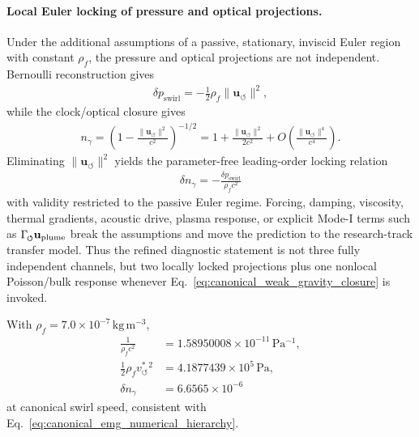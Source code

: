\documentclass[11pt]{article}
\theoremstyle{definition}
\theoremstyle{plain}
\theoremstyle{remark}
\newcommand{\swirlarrow}{\mathchoice{\mkern-2mu\scriptstyle\boldsymbol{\circlearrowleft}}{\mkern-2mu\scriptstyle\boldsymbol{\circlearrowleft}}{\mkern-2mu\scriptscriptstyle\boldsymbol{\circlearrowleft}}{\mkern-2mu\scriptscriptstyle\boldsymbol{\circlearrowleft}}}
\newcommand{\rhoF}{{\rho_{\!f}}}
\newcommand{\vchar}{v_{\!\boldsymbol{\circlearrowleft}}^{\ast}}
\newcommand{\uswirl}{\mathbf{u}_{\!\boldsymbol{\circlearrowleft}}}
\begin{document}
        \paragraph{Local Euler locking of pressure and optical projections.}
        Under the additional assumptions of a passive, stationary, inviscid Euler
        region with constant \(\rhoF\), the pressure and optical projections are not
        independent.  Bernoulli reconstruction gives
        \begin{align}
            \delta p_{\mathrm{swirl}}
            =
            -\frac{1}{2}\rhoF\lVert\uswirl\rVert^2,
        \end{align}
        while the clock/optical closure gives
        \begin{align}
            n_\gamma
            =
            \left(
                1-\frac{\lVert\uswirl\rVert^2}{c^2}
            \right)^{-1/2}
            =
            1+\frac{\lVert\uswirl\rVert^2}{2c^2}
            +O\!\left(\frac{\lVert\uswirl\rVert^4}{c^4}\right).
        \end{align}
        Eliminating \(\lVert\uswirl\rVert^2\) yields the parameter-free leading-order
        locking relation
        \begin{align}
            \boxed{
            \delta n_\gamma
            =
            -\frac{\delta p_{\mathrm{swirl}}}{\rhoF c^2}
            }
            \label{eq:canonical_pressure_optical_locking}
        \end{align}
        with validity restricted to the passive Euler regime.  Forcing, damping,
        viscosity, thermal gradients, acoustic drive, plasma response, or explicit
        Mode-I terms such as \(\Gamma_{\swirlarrow}\mathbf{u}_{\mathrm{plume}}\)
        break the assumptions and move the prediction to the research-track transfer
        model.  Thus the refined diagnostic statement is not three fully independent
        channels, but two locally locked projections plus one nonlocal Poisson/bulk
        response whenever Eq.~\eqref{eq:canonical_weak_gravity_closure} is invoked.

        With \(\rhoF=7.0\times10^{-7}\,\mathrm{kg\,m^{-3}}\),
        \begin{align}
            \frac{1}{\rhoF c^2}
            &=
            1.58950008\times10^{-11}\,\mathrm{Pa^{-1}},
            \\
            \frac{1}{2}\rhoF\vchar{}^2
            &=
            4.1877439\times10^5\,\mathrm{Pa},
            \\
            \delta n_\gamma
            &=
            6.6565\times10^{-6}
        \end{align}
        at canonical swirl speed, consistent with Eq.~\eqref{eq:canonical_emg_numerical_hierarchy}.
\end{document}
